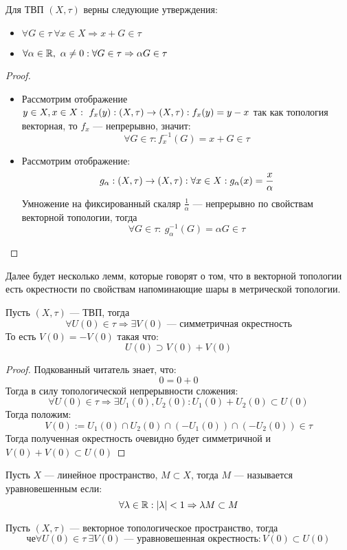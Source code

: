 {\footnotesize \color{violet}
\begin{claim}
	Для ТВП $(X, \tau)$ верны следующие утверждения:
	\begin{itemize}
		\item $
		\forall G \in \tau \ \forall x \in X \Rightarrow x + G \in \tau
		$
		\item $\forall \alpha \in \mathbb{R}, \ \alpha \neq 0: \forall G \in \tau \Rightarrow \alpha G \in \tau$
	\end{itemize}
\end{claim}
\begin{proof}
	\hfill
	\begin{itemize}
		\item 
		Рассмотрим отображение $y \in X, x \in X: \ f_x(y): (X,\tau) \rightarrow (X,\tau): f_x(y)  = y - x$ так как топология векторная, то $f_x$ --- непрерывно, значит:
		$$
		\forall G \in \tau: f_x^{-1}(G) = x + G \in \tau
		$$
		\item  Рассмотрим отображение: 
		$$
		g_\alpha : (X,\tau) \rightarrow (X,\tau): \forall x \in X : g_\alpha (x) = \frac{x}{\alpha} 
		$$
		Умножение на фиксированный скаляр $\frac{1}{\alpha}$ --- непрерывно по свойствам векторной топологии, тогда 
		$$
		\forall G \in \tau: \ g_\alpha^{-1}(G) = \alpha G \in \tau
		$$
	\end{itemize}
\end{proof}
Далее будет несколько лемм, которые говорят о том, что в векторной топологии есть окрестности по свойствам напоминающие шары в метрической топологии. 
\begin{lemma}
	\label{lem:sym1}
	Пусть $(X, \tau)$  --- ТВП, тогда 
	$$
	\forall U(0) \in \tau \Rightarrow \exists V(0)  \text{ --- симметричная окрестность}
	$$
	То есть $ V(0) = -V(0)$  такая что:
	$$
	U(0) \supset V(0) + V(0)
	$$
\end{lemma}

\begin{proof}
	Подкованный читатель знает, что: 
	$$
	0 = 0 + 0
	$$
	Тогда в силу топологической непрерывности сложения: 
	$$
	\forall U(0) \in \tau \Rightarrow \exists U_1(0), U_2(0):  U_1(0) + U_2(0) \subset U(0)
	$$
	Тогда положим: 
	$$
	V(0) := U_1(0) \cap U_2(0) \cap (-U_1(0)) \cap (-U_2(0)) \in \tau
	$$
	Тогда полученная окрестность очевидно будет симметричной и $V(0) + V(0) \subset U(0)$
\end{proof}

\begin{definition}
	Пусть $X$ --- линейное пространство, $M \subset X$, тогда $M$ --- называется уравновешенным если: 
	$$
	\forall \lambda \in \mathbb{R}: |\lambda| < 1 \Rightarrow \lambda M \subset M 
	$$
\end{definition}
\begin{lemma}
	\label{lem:tvs1}
	Пусть $(X, \tau)$ --- векторное топологическое пространство, тогда 
	$$че
	\forall U(0) \in \tau \ \exists V(0) \text{ --- уравновешенная окрестность}: V(0) \subset U(0)
	$$
\end{lemma}

}

